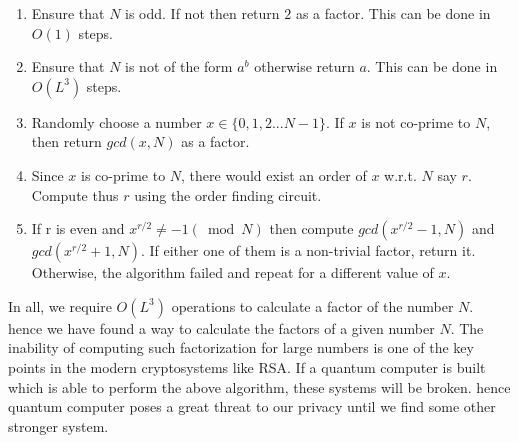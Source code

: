 \begin{enumerate}
\item Ensure that $N$ is odd. If not then return $2$ as a factor. This can be done in $O(1)$ steps.
\item Ensure that $N$ is not of the form $a^b$ otherwise return $a$. This can be done in $O(L^3)$ steps.
\item Randomly choose a number $x \in \{0,1,2...N-1\}$. If $x$ is not co-prime to $N$, then return $gcd(x,N)$ as  a factor. 
\item Since $x$ is co-prime to $N$, there would exist an order of $x$ w.r.t. $N$ say $r$. Compute thus $r$ using the order finding circuit.
\item If r is even and $x^{r/2} \ne -1 (\bmod N)$ then compute $gcd(x^{r/2}-1,N)$ and $gcd(x^{r/2}+1,N)$. If either one of them is a non-trivial factor, return it. Otherwise, the algorithm failed and repeat for a different value of $x$.
\end{enumerate}
In all, we require $O(L^3)$ operations to calculate a factor of  the number $N$.\\
hence we have found a way to calculate the factors of a given number $N$. The inability of computing such factorization for large numbers is one of the key points in the modern cryptosystems like RSA. If a quantum computer is built which is able to perform the above algorithm, these systems will be broken. hence quantum computer poses a great threat to our privacy until we find some other stronger system.

